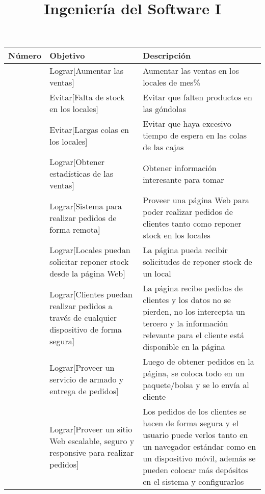 \documentclass[a4paper]{article}
\title{Ingeniería del Software I}
\begin{document}
\begin{table}[h]
\begin{tabular}{p{1.5cm} p{7cm} p{8cm}}
\rule{0pt}{1.2em} Número & Objetivo & Descripción\\[0.2em]
\hline

\rule{0pt}{1.2em}  & Lograr[Aumentar las ventas] & Aumentar las ventas en los locales de mes\% \\[0.2em]

\rule{0pt}{1.2em}  & Evitar[Falta de stock en los locales] & Evitar que falten productos en las góndolas \\[0.2em]

\rule{0pt}{1.2em}  & Evitar[Largas colas en los locales] & Evitar que haya excesivo tiempo de espera en las colas de las cajas \\[0.2em]

\rule{0pt}{1.2em}  & Lograr[Obtener estadísticas de las ventas] & Obtener información interesante para tomar \\[0.2em]

\rule{0pt}{1.2em}  & Lograr[Sistema para realizar pedidos de forma remota] & Proveer una página Web para poder realizar pedidos de clientes tanto como reponer stock en los locales \\[0.2em]

\rule{0pt}{1.2em}  & Lograr[Locales puedan solicitar reponer stock desde la página Web] & La página pueda recibir solicitudes de reponer stock de un local \\[0.2em]

\rule{0pt}{1.2em}  & Lograr[Clientes puedan realizar pedidos a través de cualquier dispositivo de forma segura] & La página recibe pedidos de clientes y los datos no se pierden, no los intercepta un tercero y la información relevante para el cliente está disponible en la página \\[0.2em]

\rule{0pt}{1.2em}  & Lograr[Proveer un servicio de armado y entrega de pedidos] & Luego de obtener pedidos en la página, se coloca todo en un paquete/bolsa y se lo envía al cliente \\[0.2em]

\rule{0pt}{1.2em}  & Lograr[Proveer un sitio Web escalable, seguro y responsive para realizar pedidos] & Los pedidos de los clientes se hacen de forma segura y el usuario puede verlos tanto en un navegador estándar como en un dispositivo móvil, además se pueden colocar más depósitos en el sistema y configurarlos \\[0.2em]


\end{tabular}
\end{table}
\end{document}
